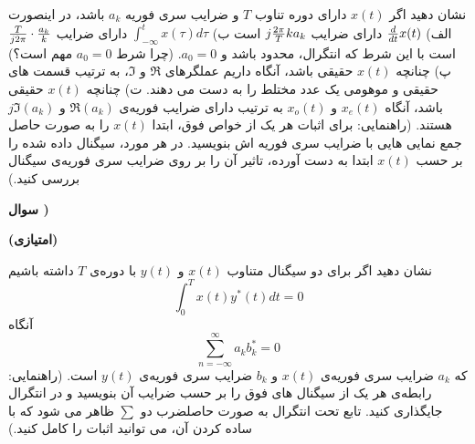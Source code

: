 \documentclass[10pt,letterpaper]{article}
\newcommand{\nl}{\newline\newline}
\newcounter{QuestionNumber}
\newcommand{\Q}{
\textbf{
سوال \theQuestionNumber)
}
\stepcounter{QuestionNumber}
}
\begin{document}
نشان دهید اگر $x(t)$ دارای دوره تناوب $T$ و ضرایب سری فوریه $a_k$ باشد، در اینصورت
\nl
الف) 
$
{d\over dt}x(t)
$
 دارای ضرایب 
$
j{2\pi\over T}ka_k
$
 است
\nl
ب) 
$
\int_{-\infty}^t x(\tau)d\tau
$
 دارای ضرایب 
$
{T\over j2\pi}\cdot{a_k\over k}
$
 است با این شرط که انتگرال، محدود باشد و $a_0=0$. (چرا شرط $a_0=0$ مهم است؟)
\nl
پ) چنانچه $x(t)$ حقیقی باشد، آنگاه داریم
عملگرهای $\Re$ و $\Im$، به ترتیب قسمت های حقیقی و موهومی یک عدد مختلط را به دست می دهند.
\nl
ت) چنانچه $x(t)$ حقیقی باشد، آنگاه $x_e(t)$ و $x_o(t)$ به ترتیب دارای ضرایب فوریه‌ی 
$
\Re (a_k)
$
 و 
$
j\Im (a_k)
$
 هستند.
\nl
(راهنمایی: برای اثبات هر یک از خواص فوق، ابتدا $x(t)$ را به صورت حاصل جمع نمایی هایی با ضرایب سری فوریه اش بنویسید. در هر مورد، سیگنال داده شده را بر حسب $x(t)$ ابتدا به دست آورده، تاثیر آن را بر روی ضرایب سری فوریه‌ی سیگنال بررسی کنید.)
\nl
\Q
\textbf{(امتیازی)}

نشان دهید اگر برای دو سیگنال متناوب 
$
x(t)
$
 و 
$
y(t)
$
 با دوره‌ی $T$ داشته باشیم
$$
\int_{0}^T x(t)y^*(t)dt=0
$$
آنگاه
$$
\sum_{n=-\infty}^{\infty} a_kb_k^*=0
$$
که $a_k$ ضرایب سری فوریه‌ی $x(t)$ و $b_k$ ضرایب سری فوریه‌ی $y(t)$ است.
\nl
(راهنمایی: رابطه‌ی هر یک از سیگنال های فوق را بر حسب ضرایب آن بنویسید و در انتگرال جایگذاری کنید. تابع تحت انتگرال به صورت حاصلضرب دو $\sum$ ظاهر می شود که با ساده کردن آن، می توانید اثبات را کامل کنید.)
%
\end{document}
